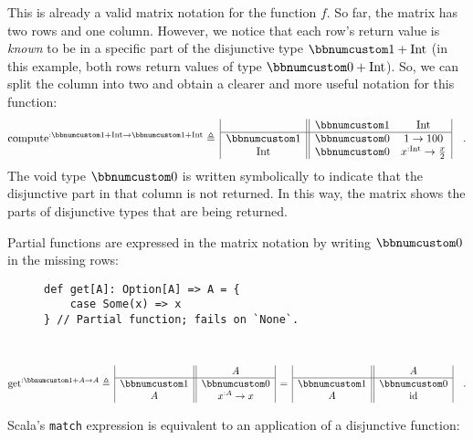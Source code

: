 This is already a valid matrix notation for the function $f$. So
far, the matrix has two rows and one column. However, we notice that
each row\textsf{'}s return value is \emph{known} to be in a specific part of
the disjunctive type $\bbnum 1+\text{Int}$ (in this example, both
rows return values of type $\bbnum 0+\text{Int}$). So, we can split
the column into two and obtain a clearer and more useful notation
for this function:
\[
\text{compute}^{:\bbnum 1+\text{Int}\rightarrow\bbnum 1+\text{Int}}\triangleq\,\begin{array}{|c||cc|}
 & \bbnum 1 & \text{Int}\\
\hline \bbnum 1 & \bbnum 0 & 1\rightarrow100\\
\text{Int} & \bbnum 0 & x^{:\text{Int}}\rightarrow\frac{x}{2}
\end{array}\quad.
\]
The void type $\bbnum 0$ is
written symbolically to indicate that the disjunctive part in that
column is not returned. In this way, the matrix shows the parts of
disjunctive types that are being returned. 

Partial functions are expressed in the matrix notation by writing
$\bbnum 0$ in the missing rows:

\begin{wrapfigure}{l}{0.45\columnwidth}%
\vspace{-0.65\baselineskip}
\begin{lstlisting}
def get[A]: Option[A] => A = {
    case Some(x) => x
} // Partial function; fails on `None`.
\end{lstlisting}

\vspace{-0.75\baselineskip}
\end{wrapfigure}%

~\vspace{-1.35\baselineskip}
\[
\text{get}^{:\bbnum 1+A\rightarrow A}\triangleq\,\begin{array}{|c||c|}
 & A\\
\hline \bbnum 1 & \bbnum 0\\
A & x^{:A}\rightarrow x
\end{array}\,=\,\begin{array}{|c||c|}
 & A\\
\hline \bbnum 1 & \bbnum 0\\
A & \text{id}
\end{array}\quad.
\]
\vspace{-0.9\baselineskip}

Scala\textsf{'}s \lstinline!match! expression is equivalent to an application
of a disjunctive function:

